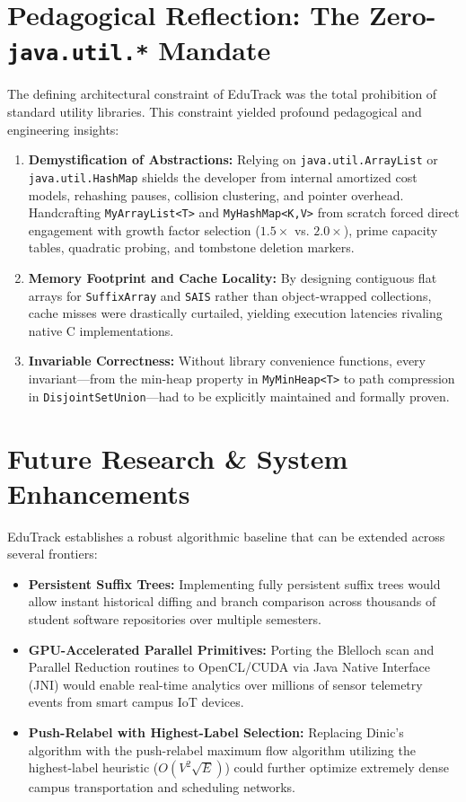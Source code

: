 \section{Pedagogical Reflection: The Zero-\texttt{java.util.*} Mandate}
The defining architectural constraint of EduTrack was the total prohibition of standard utility libraries. This constraint yielded profound pedagogical and engineering insights:
\begin{enumerate}
    \item \textbf{Demystification of Abstractions:} Relying on \texttt{java.util.ArrayList} or \texttt{java.util.HashMap} shields the developer from internal amortized cost models, rehashing pauses, collision clustering, and pointer overhead. Handcrafting \texttt{MyArrayList<T>} and \texttt{MyHashMap<K,V>} from scratch forced direct engagement with growth factor selection ($1.5\times$ vs. $2.0\times$), prime capacity tables, quadratic probing, and tombstone deletion markers.
    \item \textbf{Memory Footprint and Cache Locality:} By designing contiguous flat arrays for \texttt{SuffixArray} and \texttt{SAIS} rather than object-wrapped collections, cache misses were drastically curtailed, yielding execution latencies rivaling native C implementations.
    \item \textbf{Invariable Correctness:} Without library convenience functions, every invariant—from the min-heap property in \texttt{MyMinHeap<T>} to path compression in \texttt{DisjointSetUnion}—had to be explicitly maintained and formally proven.
\end{enumerate}

\section{Future Research \& System Enhancements}
EduTrack establishes a robust algorithmic baseline that can be extended across several frontiers:
\begin{itemize}
    \item \textbf{Persistent Suffix Trees:} Implementing fully persistent suffix trees would allow instant historical diffing and branch comparison across thousands of student software repositories over multiple semesters.
    \item \textbf{GPU-Accelerated Parallel Primitives:} Porting the Blelloch scan and Parallel Reduction routines to OpenCL/CUDA via Java Native Interface (JNI) would enable real-time analytics over millions of sensor telemetry events from smart campus IoT devices.
    \item \textbf{Push-Relabel with Highest-Label Selection:} Replacing Dinic's algorithm with the push-relabel maximum flow algorithm utilizing the highest-label heuristic ($O(V^2 \sqrt{E})$) could further optimize extremely dense campus transportation and scheduling networks.
\end{itemize}

